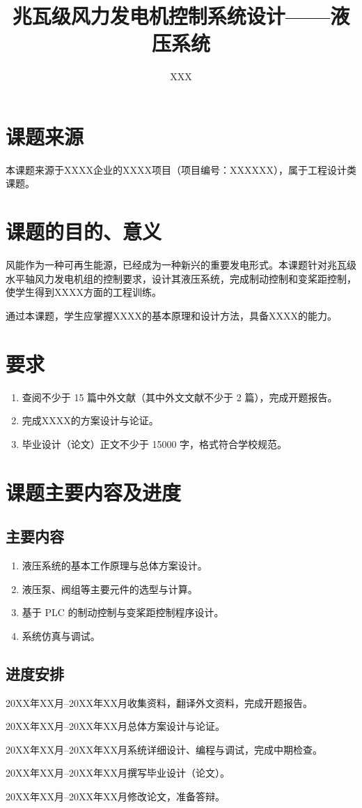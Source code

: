 \documentclass{sdjutaskbook}
\title{兆瓦级风力发电机控制系统设计——液压系统}
\author{XXX}
\begin{document}
\makecover

\section{课题来源}
本课题来源于XXXX企业的XXXX项目（项目编号：XXXXXX），属于工程设计类课题。

\section{课题的目的、意义}
风能作为一种可再生能源，已经成为一种新兴的重要发电形式。本课题针对兆瓦级水平轴风力发电机组的控制要求，设计其液压系统，完成制动控制和变桨距控制，使学生得到XXXX方面的工程训练。

通过本课题，学生应掌握XXXX的基本原理和设计方法，具备XXXX的能力。

\section{要求}
\begin{enumerate}
  \item 查阅不少于 15 篇中外文献（其中外文文献不少于 2 篇），完成开题报告。
  \item 完成XXXX的方案设计与论证。
  \item 毕业设计（论文）正文不少于 15000 字，格式符合学校规范。
\end{enumerate}

\section{课题主要内容及进度}
\subsection{主要内容}
\begin{enumerate}
  \item 液压系统的基本工作原理与总体方案设计。
  \item 液压泵、阀组等主要元件的选型与计算。
  \item 基于 PLC 的制动控制与变桨距控制程序设计。
  \item 系统仿真与调试。
\end{enumerate}

\subsection{进度安排}
\begin{schedule}
  \item{20XX年XX月--20XX年XX月}{收集资料，翻译外文资料，完成开题报告。}
  \item{20XX年XX月--20XX年XX月}{总体方案设计与论证。}
  \item{20XX年XX月--20XX年XX月}{系统详细设计、编程与调试，完成中期检查。}
  \item{20XX年XX月--20XX年XX月}{撰写毕业设计（论文）。}
  \item{20XX年XX月--20XX年XX月}{修改论文，准备答辩。}
\end{schedule}
\end{document}
